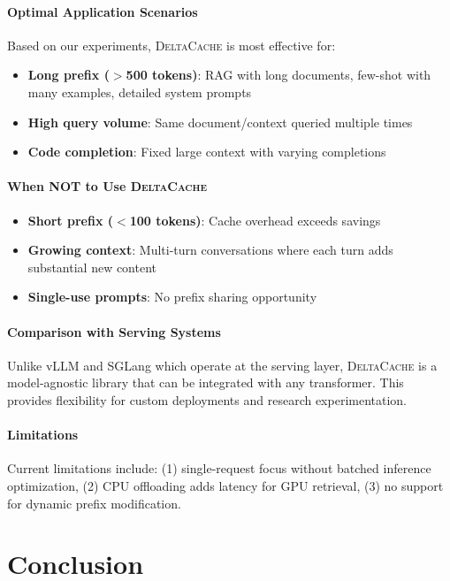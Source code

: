 \documentclass{article}
\newcommand{\deltacache}{\textsc{DeltaCache}}
\begin{document}
\paragraph{Optimal Application Scenarios}
Based on our experiments, \deltacache{} is most effective for:
\begin{itemize}
    \item \textbf{Long prefix ($>$500 tokens)}: RAG with long documents, few-shot with many examples, detailed system prompts
    \item \textbf{High query volume}: Same document/context queried multiple times
    \item \textbf{Code completion}: Fixed large context with varying completions
\end{itemize}

\paragraph{When NOT to Use \deltacache{}}
\begin{itemize}
    \item \textbf{Short prefix ($<$100 tokens)}: Cache overhead exceeds savings
    \item \textbf{Growing context}: Multi-turn conversations where each turn adds substantial new content
    \item \textbf{Single-use prompts}: No prefix sharing opportunity
\end{itemize}

\paragraph{Comparison with Serving Systems}
Unlike vLLM and SGLang which operate at the serving layer, \deltacache{} is a model-agnostic library that can be integrated with any transformer.
This provides flexibility for custom deployments and research experimentation.

\paragraph{Limitations}
Current limitations include: (1) single-request focus without batched inference optimization, (2) CPU offloading adds latency for GPU retrieval, (3) no support for dynamic prefix modification.

\section{Conclusion}
\end{document}
